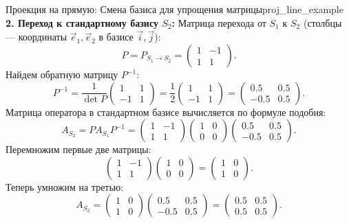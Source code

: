 \documentclass[12pt,a4paper]{article}
\begin{document}
\begin{definition}{Проекция на прямую: Смена базиса для упрощения
  матрицы}{proj_line_example}
  \textbf{2. Переход к стандартному базису $S_2$:}
  Матрица перехода от $S_1$ к $S_2$ (столбцы — координаты $\vec{e}_1,
  \vec{e}_2$ в базисе $\vec{i}, \vec{j}$):
  \[
    P = P_{S_1 \to S_2} =
    \begin{pmatrix} 1 & -1 \\ 1 & 1
    \end{pmatrix}.
  \]
  Найдем обратную матрицу $P^{-1}$:
  \[
    P^{-1} = \frac{1}{\det P}
    \begin{pmatrix} 1 & 1 \\ -1 & 1
    \end{pmatrix} = \frac{1}{2}
    \begin{pmatrix} 1 & 1 \\ -1 & 1
    \end{pmatrix} =
    \begin{pmatrix} 0.5 & 0.5 \\ -0.5 & 0.5
    \end{pmatrix}.
  \]
  Матрица оператора в стандартном базисе вычисляется по формуле подобия:
  \[
    A_{S_2} = P A_{S_1} P^{-1} =
    \begin{pmatrix} 1 & -1 \\ 1 & 1
    \end{pmatrix}
    \begin{pmatrix} 1 & 0 \\ 0 & 0
    \end{pmatrix}
    \begin{pmatrix} 0.5 & 0.5 \\ -0.5 & 0.5
    \end{pmatrix}.
  \]
  Перемножим первые две матрицы:
  \[
    \begin{pmatrix} 1 & -1 \\ 1 & 1
    \end{pmatrix}
    \begin{pmatrix} 1 & 0 \\ 0 & 0
    \end{pmatrix} =
    \begin{pmatrix} 1 & 0 \\ 1 & 0
    \end{pmatrix}.
  \]
  Теперь умножим на третью:
  \[
    A_{S_2} =
    \begin{pmatrix} 1 & 0 \\ 1 & 0
    \end{pmatrix}
    \begin{pmatrix} 0.5 & 0.5 \\ -0.5 & 0.5
    \end{pmatrix} =
    \begin{pmatrix} 0.5 & 0.5 \\ 0.5 & 0.5
    \end{pmatrix}.
  \]


\end{definition}
\end{document}

